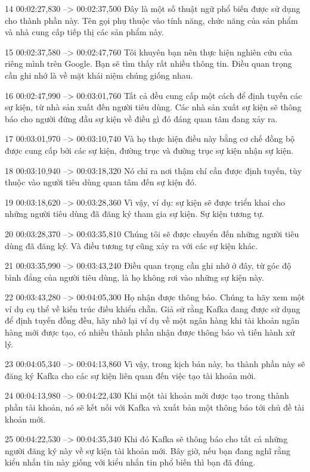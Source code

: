 14
00:02:27,830 --> 00:02:37,500
Đây là một số thuật ngữ phổ biến được sử dụng cho thành phần này.  Tên gọi phụ thuộc vào tính năng, chức năng của sản phẩm và nhà cung cấp tiếp thị các sản phẩm này.

15
00:02:37,580 --> 00:02:47,760
Tôi khuyên bạn nên thực hiện nghiên cứu của riêng mình trên Google.  Bạn sẽ tìm thấy rất nhiều thông tin.  Điều quan trọng cần ghi nhớ là về mặt khái niệm chúng giống nhau.

16
00:02:47,990 --> 00:03:01,760
Tất cả đều cung cấp một cách để định tuyến các sự kiện, từ nhà sản xuất đến người tiêu dùng.  Các nhà sản xuất sự kiện sẽ thông báo cho người đứng đầu sự kiện về điều gì đó đáng quan tâm đang xảy ra.

17
00:03:01,970 --> 00:03:10,740
Và họ thực hiện điều này bằng cơ chế đồng bộ được cung cấp bởi các sự kiện, đường trục và đường trục sự kiện nhận sự kiện.

18
00:03:10,940 --> 00:03:18,320
Nó chỉ ra nơi thậm chí cần được định tuyến, tùy thuộc vào người tiêu dùng quan tâm đến sự kiện đó.

19
00:03:18,620 --> 00:03:28,360
Vì vậy, ví dụ: sự kiện sẽ được triển khai cho những người tiêu dùng đã đăng ký tham gia sự kiện.  Sự kiện tương tự.

20
00:03:28,370 --> 00:03:35,810
Chúng tôi sẽ được chuyển đến những người tiêu dùng đã đăng ký.  Và điều tương tự cũng xảy ra với các sự kiện khác.

21
00:03:35,990 --> 00:03:43,240
Điều quan trọng cần ghi nhớ ở đây, từ góc độ bình đẳng của người tiêu dùng, là họ không rơi vào những sự kiện này.

22
00:03:43,280 --> 00:04:05,300
Họ nhận được thông báo.  Chúng ta hãy xem một ví dụ cụ thể về kiến ​​trúc điều khiển chẵn.  Giả sử rằng Kafka đang được sử dụng để định tuyến đồng đều, hãy nhớ lại ví dụ về một ngân hàng khi tài khoản ngân hàng mới được tạo, có nhiều thành phần nhận được thông báo và tiến hành xử lý.

23
00:04:05,340 --> 00:04:13,860
Vì vậy, trong kịch bản này, ba thành phần này sẽ đăng ký Kafka cho các sự kiện liên quan đến việc tạo tài khoản mới.

24
00:04:13,980 --> 00:04:22,430
Khi một tài khoản mới được tạo trong thành phần tài khoản, nó sẽ kết nối với Kafka và xuất bản một thông báo tới chủ đề tài khoản mới.

25
00:04:22,530 --> 00:04:35,340
Khi đó Kafka sẽ thông báo cho tất cả những người đăng ký này về sự kiện tài khoản mới.  Bây giờ, nếu bạn đang nghĩ rằng kiểu nhắn tin này giống với kiểu nhắn tin phổ biến thì bạn đã đúng.

